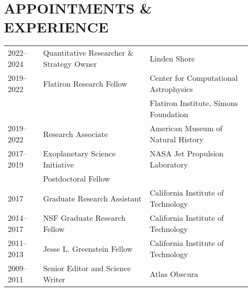 \section{\large APPOINTMENTS \& EXPERIENCE}
\begin{tabular}{lll}
2022--2024 & Quantitative Researcher \& Strategy Owner & Linden Shore\\
2019--2022 & Flatiron Research Fellow & Center for Computational Astrophysics\\
&  & Flatiron Institute, Simons Foundation & \\
2019--2022 & Research Associate & American Museum of Natural History\\
2017--2019 & Exoplanetary Science Initiative & NASA Jet Propulsion Laboratory\\
 & Postdoctoral Fellow & \\
2017 & Graduate Research Assistant & California Institute of Technology\\
2014--2017 & NSF Graduate Research Fellow & California Institute of Technology\\
2011--2013 & Jesse L. Greenstein Fellow & California Institute of Technology\\
2009--2011 & Senior Editor and Science Writer & Atlas Obscura\\
\end{tabular}




